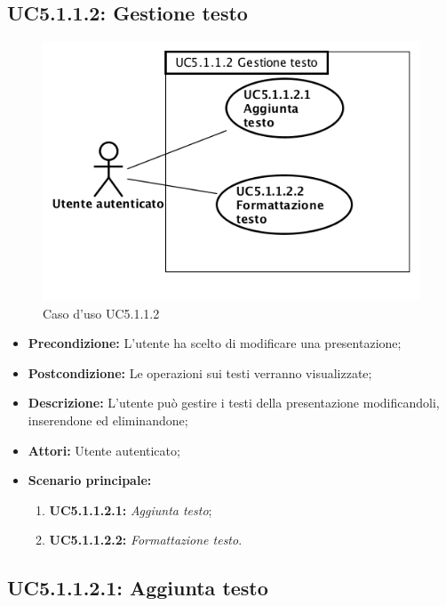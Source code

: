 \subsection{ UC5.1.1.2: Gestione testo}

\begin{figure}[h]
	\begin{center}
	\includegraphics[scale=0.4]{diagram/UC5-1-1-2.png}
	\caption{Caso d'uso UC5.1.1.2}
	\end{center}
\end{figure}
\begin{itemize}
	\item \textbf{Precondizione:} L'utente ha scelto di modificare una presentazione;
	\item \textbf{Postcondizione:} Le operazioni sui testi verranno visualizzate;
	\item \textbf{Descrizione:} L'utente può gestire i testi della presentazione modificandoli, inserendone ed eliminandone;
	\item \textbf{Attori:} Utente autenticato;
	\item \textbf{Scenario principale:}
	\begin{enumerate}
		\item \textbf{ UC5.1.1.2.1:} \textit{ Aggiunta testo};
		\item \textbf{ UC5.1.1.2.2:} \textit{ Formattazione testo}.
	\end{enumerate}
\end{itemize}
\subsection{ UC5.1.1.2.1: Aggiunta testo}

